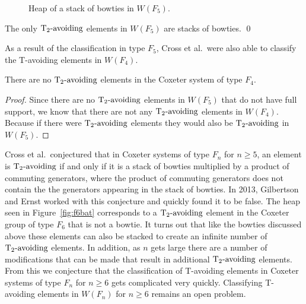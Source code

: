 \begin{figure*}[h!] \centering
{}
\caption{Heap of a stack of bowties in $W(F_5)$.}\label{fig:stackobowties}
\end{figure*}

\begin{proposition}
The only $\operatorname{T_2-\mathrm{avoiding}}$ elements in $W(F_5)$ are stacks of bowties. \qed	
\end{proposition}


As a result of the classification in type $F_5$, Cross et al.~were also able to classify the T-avoiding elements in $W(F_4)$. 

\begin{corollary}
There are no $\operatorname{T_2-\mathrm{avoiding}}$ elements in the Coxeter system of type $F_4$. 
\begin{proof}
	Since there are no $\operatorname{T_2-\mathrm{avoiding}}$ elements in $W(F_5)$ that do not have full support, we know that there are not any $\operatorname{T_2-\mathrm{avoiding}}$ elements in $W(F_4)$. Because if there were $\operatorname{T_2-\mathrm{avoiding}}$ elements they would also be $\operatorname{T_2-\mathrm{avoiding}}$ in $W(F_5)$.
\end{proof}
\end{corollary}

Cross et al.~conjectured that in Coxeter systems of type $F_n$ for $n \geq 5$, an element is $\operatorname{T_2-\mathrm{avoiding}}$ if and only if it is a stack of bowties multiplied by a product of commuting generators, where the product of commuting generators does not contain the the generators appearing in the stack of bowties. In 2013, Gilbertson and Ernst worked with this conjecture and quickly found it to be false. The heap seen in Figure~\ref{fig:f6bat} corresponds to a $\operatorname{T_2-\mathrm{avoiding}}$ element in the Coxeter group of type $F_6$ that is not a bowtie. It turns out that like the bowties discussed above these elements can also be stacked to create an infinite number of $\operatorname{T_2-\mathrm{avoiding}}$ elements. In addition, as $n$ gets large there are a number of modifications that can be made that result in additional $\operatorname{T_2-\mathrm{avoiding}}$ elements. From this we conjecture that the classification of T-avoiding elements in Coxeter systems of type $F_n$ for $n \geq 6$ gets complicated very quickly. Classifying T-avoiding elements in $W(F_n)$ for $n \geq 6$ remains an open problem. 

